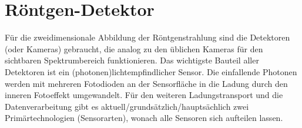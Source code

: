 \chapter{Röntgen-Detektor}
\label{text:moench_theorie}
Für die zweidimensionale Abbildung der Röntgenstrahlung sind die Detektoren (oder Kameras) gebraucht, die analog zu den üblichen Kameras für den sichtbaren Spektrumbereich funktionieren. Das wichtigste Bauteil aller Detektoren ist ein (photonen)lichtempfindlicher Sensor. Die einfallende Photonen werden mit mehreren Fotodioden an der Sensorfläche in die Ladung durch den inneren Fotoeffekt umgewandelt. Für den weiteren Ladungstransport und die Datenverarbeitung gibt es aktuell/grundsätzlich/hauptsächlich zwei Primärtechnologien (Sensorarten), wonach alle Sensoren sich aufteilen lassen.

